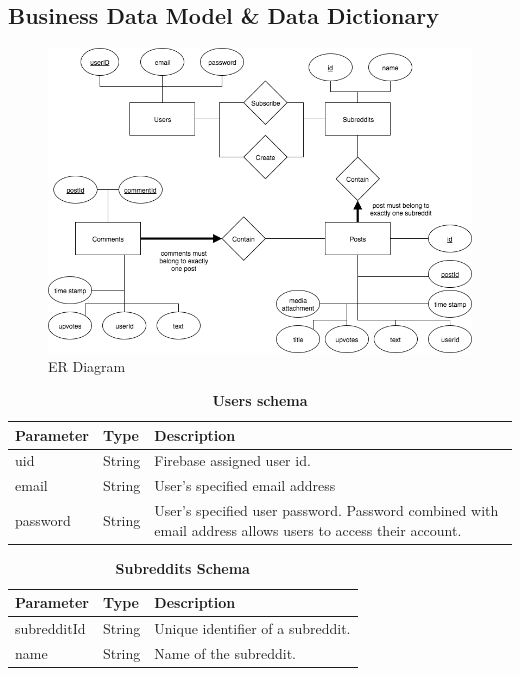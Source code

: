 \documentclass[12pt,fleqn]{article}
\begin{document}
\subsection {Business Data Model \& Data Dictionary}
\begin{figure}[H]
\centering
\includegraphics[width=16cm]{er}
\caption{ER Diagram}
\label{fig:ER}
\end{figure}

\begin{table}[H]
\caption{\bf Users schema}
\begin{tabularx}{\textwidth}{p{4cm}p{3cm}X}
\toprule {\bf Parameter} & {\bf Type} & {\bf Description}\\
\midrule
uid & String & Firebase assigned user id. \\
email & String & User's specified email address \\
password & String & User's specified user password. Password combined with email address allows users to access their account. \\
\bottomrule
\end{tabularx}
\end{table}

\begin{table}[H]
\caption{\bf Subreddits Schema}
\begin{tabularx}{\textwidth}{p{4cm}p{3cm}X}
\toprule {\bf Parameter} & {\bf Type} & {\bf Description}\\
\midrule
subredditId & String & Unique identifier of a subreddit.\\
name & String & Name of the subreddit. \\
\bottomrule
\end{tabularx}
\end{table}
\end{document}
